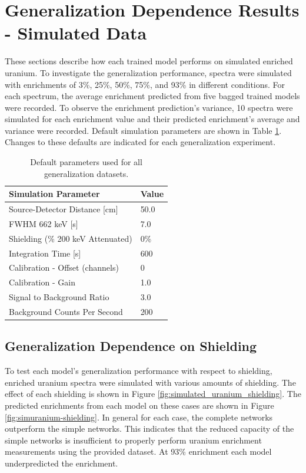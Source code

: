\section{Generalization Dependence Results - Simulated Data}

These sections describe how each trained model performs on simulated enriched uranium. To investigate the generalization performance, spectra were simulated with enrichments of 3\%, 25\%, 50\%, 75\%, and 93\% in different conditions. For each spectrum, the average enrichment predicted from five bagged trained models were recorded. To observe the enrichment prediction's variance, 10 spectra were simulated for each enrichment value and their predicted enrichment's average and variance were recorded. Default simulation parameters are shown in Table \ref{table:default_sim_params_uranium}. Changes to these defaults are indicated for each generalization experiment.

\begin{table}[H]
\centering
\caption{Default parameters used for all generalization datasets.}
\label{table:default_sim_params_uranium}
\begin{tabular}{ll}
\hline
\textbf{Simulation Parameter} &  \textbf{Value} \\ \hline
Source-Detector Distance [cm] & 50.0\\ 
FWHM 662 keV [s] & 7.0\\
Shielding (\% 200 keV Attenuated) & 0\% \\ 
Integration Time [s] & 600 \\ 
Calibration - Offset (channels) & 0 \\ 
Calibration - Gain & 1.0 \\ 
Signal to Background Ratio & 3.0 \\ 
Background Counts Per Second & 200 \\ \hline
\end{tabular}
\end{table}

\subsection{Generalization Dependence on Shielding}

To test each model's generalization performance with respect to shielding, enriched uranium spectra were simulated with various amounts of shielding. The effect of each shielding is shown in Figure \ref{fig:simulated_uranium_shielding}. The predicted enrichments from each model on these cases are shown in Figure \ref{fig:simuranium-shielding}. In general for each case, the complete networks outperform the simple networks. This indicates that the reduced capacity of the simple networks is insufficient to properly perform uranium enrichment measurements using the provided dataset. At 93\% enrichment each model underpredicted the enrichment.

